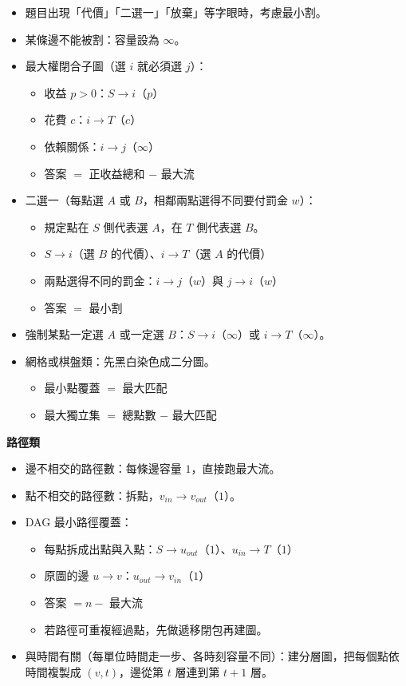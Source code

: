 \begin{itemize}
  \item 題目出現「代價」「二選一」「放棄」等字眼時，考慮最小割。
  \item 某條邊不能被割：容量設為 $\infty$。
  \item 最大權閉合子圖（選 $i$ 就必須選 $j$）：
  \begin{itemize}
    \item 收益 $p > 0$：$S \to i$（$p$）
    \item 花費 $c$：$i \to T$（$c$）
    \item 依賴關係：$i \to j$（$\infty$）
    \item 答案 $=$ 正收益總和 $-$ 最大流
  \end{itemize}
  \item 二選一（每點選 $A$ 或 $B$，相鄰兩點選得不同要付罰金 $w$）：
  \begin{itemize}
    \item 規定點在 $S$ 側代表選 $A$，在 $T$ 側代表選 $B$。
    \item $S \to i$（選 $B$ 的代價）、$i \to T$（選 $A$ 的代價）
    \item 兩點選得不同的罰金：$i \to j$（$w$）與 $j \to i$（$w$）
    \item 答案 $=$ 最小割
  \end{itemize}
  \item 強制某點一定選 $A$ 或一定選 $B$：$S \to i$（$\infty$）或 $i \to T$（$\infty$）。
  \item 網格或棋盤類：先黑白染色成二分圖。
  \begin{itemize}
    \item 最小點覆蓋 $=$ 最大匹配
    \item 最大獨立集 $=$ 總點數 $-$ 最大匹配
  \end{itemize}
\end{itemize}

{\large\bfseries 路徑類\par}
\medskip
\begin{itemize}
  \item 邊不相交的路徑數：每條邊容量 $1$，直接跑最大流。
  \item 點不相交的路徑數：拆點，$v_{in} \to v_{out}$（$1$）。
  \item DAG 最小路徑覆蓋：
  \begin{itemize}
    \item 每點拆成出點與入點：$S \to u_{out}$（$1$）、$u_{in} \to T$（$1$）
    \item 原圖的邊 $u \to v$：$u_{out} \to v_{in}$（$1$）
    \item 答案 $= n -$ 最大流
    \item 若路徑可重複經過點，先做遞移閉包再建圖。
  \end{itemize}
  \item 與時間有關（每單位時間走一步、各時刻容量不同）：建分層圖，把每個點依時間複製成 $(v, t)$，邊從第 $t$ 層連到第 $t+1$ 層。
\end{itemize}

